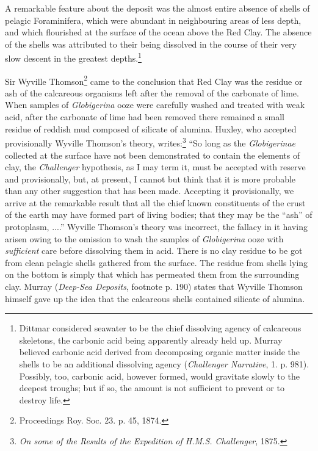 \documentclass[a4paper, 12pt, oneside, landscape]{article}
\begin{document}
A remarkable feature about the deposit was the almost entire absence of shells of pelagic Foraminifera, which were abundant in neighbouring areas of less depth, and which flourished at the surface of the ocean above the Red Clay. The absence of the shells was attributed to their being dissolved in the course of their very slow descent in the greatest depths.\footnote{Dittmar considered seawater to be the chief dissolving agency of calcareous skeletons, the carbonic acid being apparently already held up. Murray believed carbonic acid derived from decomposing organic matter inside the shells to be an additional dissolving agency (\emph{Challenger Narrative}, 1. p. 981). Possibly, too, carbonic acid, however formed, would gravitate slowly to the deepest troughs; but if so, the amount is not sufficient to prevent or to destroy life.}

Sir Wyville Thomson\footnote{Proceedings Roy. Soc. 23. p. 45, 1874.} came to the conclusion that Red Clay was the residue or ash of the calcareous organisms left after the removal of the carbonate of lime. When samples of \emph{Globigerina} ooze were carefully washed and treated with weak acid, after the carbonate of lime had been removed there remained a small residue of reddish mud composed of silicate of alumina. Huxley, who accepted provisionally Wyville Thomson's theory, writes:\footnote{\emph{On some of the Results of the Expedition of H.M.S. Challenger}, 1875.} ``So long as the \emph{Globigerinae} collected at the surface have not been demonstrated to contain the elements of clay, the \emph{Challenger} hypothesis, as I may term it, must be accepted with reserve and provisionally, but, at present, I cannot but think that it is more probable than any other suggestion that has been made. Accepting it provisionally, we arrive at the remarkable result that all the chief known constituents of the crust of the earth may have formed part of living bodies; that they may be the ``ash'' of protoplasm, ....'' Wyville Thomson's theory was incorrect, the fallacy in it having arisen owing to the omission to wash the samples of \emph{Globigerina} ooze with \emph{sufficient} care before dissolving them in acid. There is no clay residue to be got from clean pelagic shells gathered from the surface. The residue from shells lying on the bottom is simply that which has permeated them from the surrounding clay. Murray (\emph{Deep-Sea Deposits}, footnote p. 190) states that Wyville Thomson himself gave up the idea that the calcareous shells contained silicate of alumina.
\end{document}
